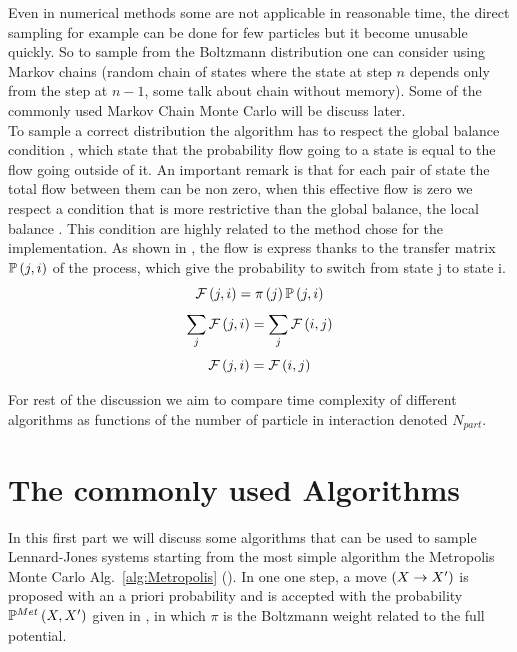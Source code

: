 \documentclass[jcp,twocolumn,longbibliography,superscriptaddress]{revtex4-2}
\newcommand{\prog}[1]{Alg.~\ref{alg:#1} (\sub{#1})}
\newcommand{\deplb}[2]{\glb #1 \rightarrow #2 \grb}
\newcommand{\Npart}{N_{part}}
\begin{document}
	Even in numerical methods some are not applicable in reasonable time, the direct sampling for example can be done for few particles but it become unusable quickly.
	So to sample from the Boltzmann distribution one can consider using Markov chains (random chain of states where the state at step $n$ depends only from the step at $n-1$, some talk about chain without memory). Some of the commonly used Markov Chain Monte Carlo will be discuss later.\\
	To sample a correct distribution the algorithm has to respect the global balance condition , which state that the probability flow going to a state is equal to the flow going outside of it. An important remark is that for each pair of state the total flow between them can be non zero, when this effective flow is zero we respect a condition that is more restrictive than the global balance, the local balance . This condition are highly related to the method chose for the implementation. As shown in , the flow is express thanks to the transfer matrix $\mathbb{P} \left( j,i \right)$ of the process, which give the probability to switch from state j to state i.
	\begin{equation}
		\label{eq: Flow}
		\mathcal{F} \left( j , i \right) = \pi \left( j \right) \mathbb{P} \left( j,i \right)
	\end{equation}
	\begin{equation}
		\label{eq: Global Balance}
		\sum\limits_{j} \mathcal{F} \left( j , i \right) = \sum\limits_{j} \mathcal{F} \left( i , j \right)
	\end{equation}
	\begin{equation}
		\label{eq: Local Balance}
		\mathcal{F} \left( j , i \right) = \mathcal{F} \left( i , j \right)
	\end{equation}
	
	For rest of the discussion we aim to compare time complexity of different algorithms as functions of the number of particle in interaction denoted $\Npart$.
	
	\section{The commonly used Algorithms}
	In this first part we will discuss some algorithms that can be used to sample Lennard-Jones systems starting from the most simple algorithm the Metropolis Monte Carlo \prog{Metropolis}. In one one step, a move $\deplb{X}{X'}$ is proposed with an a priori probability and is accepted with the probability $\mathbb{P}^{Met}\left( X, X'\right)$ given in , in which $\pi$ is the Boltzmann weight related to the full potential.
	
\end{document}
